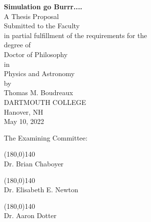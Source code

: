 \documentclass[11pt, manuscript]{aastex62}
\begin{document}
\begin{titlepage}
    \begin{center}
        \Large
        \vspace*{1cm}
		\textbf{Simulation go Burrr....} \\
        \vspace{0.75cm}
        \large
        A Thesis Proposal \\
        \vspace{0.25cm}
        Submitted to the Faculty \\
        in partial fulfillment of the requirements for the \\
        degree of \\
        \vspace{0.25cm}
        Doctor of Philosophy \\
        \vspace{0.25cm}
        in \\
        \vspace{0.25cm}
        Physics and Astronomy \\
        \vspace{0.5cm}
        by \\
        \vspace{0.25cm}
        Thomas M. Boudreaux \\
        \vspace{0.3cm}
        DARTMOUTH COLLEGE \\
        Hanover, NH \\
        May 10, 2022
     \end{center}
\vspace{1cm}
\begin{flushright}
The Examining Committee: \hspace{\parindent}
\vspace{0.4cm}
\end{flushright}
\begin{flushright}
\line(180,0){140}\\
        Dr. Brian Chaboyer
        \end{flushright}
        
        \begin{flushright}
        \line(180,0){140}\\
        Dr. Elisabeth E. Newton
        \end{flushright}
        
        \begin{flushright}
        \line(180,0){140}\\
        Dr. Aaron Dotter
        \end{flushright}

\end{titlepage}
\end{document}
